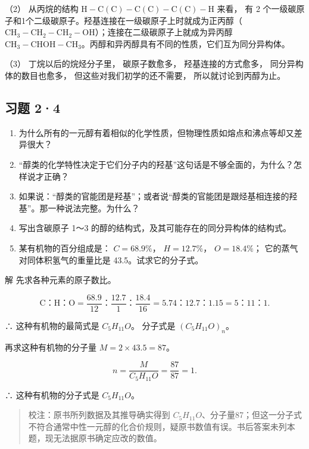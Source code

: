 （2） 从丙烷的结构
\(\mathrm{H}-\mathrm{C}(\mathrm{C})-\mathrm{C}(\mathrm{C})-\mathrm{C}(\mathrm{C})-\mathrm{H}\)
来看， 有 2
个一级碳原子和1个二级碳原子。羟基连接在一级碳原子上时就成为正丙醇（\(\mathrm{CH}_{3}-\mathrm{CH}_{2}-\mathrm{CH}_{2}-\mathrm{OH}\)）；连接在二级碳原子上就成为异丙醇
\(\mathrm{CH}_{3}-\mathrm{CHOH}-\mathrm{CH}_{3}\)。丙醇和异丙醇具有不同的性质，它们互为同分异构体。

（3） 丁烷以后的烷烃分子里， 碳原子数愈多， 羟基连接的方式愈多，
同分异构体的数目也愈多， 但这些对我们初学的还不需要，
所以就讨论到丙醇为止。

\subsection{习题 2·4}

\begin{enumerate}
\item
  为什么所有的一元醇有着相似的化学性质，但物理性质如熔点和沸点等却又差异很大？
\item
  ``醇类的化学特性决定于它们分子内的羟基''这句话是不够全面的，为什么？怎样说才正确？
\item
  如果说：``醇类的官能团是羟基''；或者说``醇类的官能团是跟烃基相连接的羟基''。那一种说法完整。为什么？
\item
  写出含碳原子 1～3 的醇的结构式，及其可能存在的同分异构体的结构式。
\item
  某有机物的百分组成是： \(C = 68.9\%\)， \(H = 12.7\%\)，
  \(O = 18.4\%\)； 它的蒸气对同体积氢气的重量比是 43.5。试求它的分子式。
\end{enumerate}

解 先求各种元素的原子数比。

\[
\mathrm{C}\text{：} \mathrm{H}\text{：} \mathrm{O} = \frac {68.9}{12}\text{：} \frac {12.7}{1}\text{：} \frac {18.4}{16} = 5.74\text{：} 12.7\text{：} 1.15 = 5\text{：} 11\text{：} 1.
\]

∴ 这种有机物的最简式是 \(C_{5}H_{11}O\)。 分子式是
\((C_{5}H_{11}O)_{n}\)。

再求这种有机物的分子量 \(M=2\times43.5=87\)。

\[
n = \frac {M}{C _ {5} H _ {11} O} = \frac {87}{87} = 1.
\]

∴ 这种有机物的分子式是 \(C_{5}H_{11}O\)。

\begin{quote}
校注：原书所列数据及其推导确实得到
\(C_{5}H_{11}O\)、分子量87；但这一分子式不符合通常中性一元醇的化合价规则，疑原书数值有误。书后答案未列本题，现无法据原书确定应改的数值。
\end{quote}

